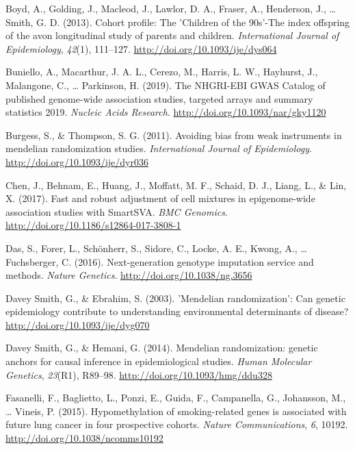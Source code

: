 \documentclass[11pt,twoside]{bristolthesis}
\newlength{\cslhangindent}
\newenvironment{cslreferences}%
  {\setlength{\parindent}{0pt}%
  \everypar{\setlength{\hangindent}{\cslhangindent}}\ignorespaces}%
  {\par}
\begin{document}
\begin{cslreferences}
\leavevmode\hypertarget{ref-Boyd2013}{}%
Boyd, A., Golding, J., Macleod, J., Lawlor, D. A., Fraser, A., Henderson, J., \ldots{} Smith, G. D. (2013). Cohort profile: The 'Children of the 90s'-The index offspring of the avon longitudinal study of parents and children. \emph{International Journal of Epidemiology}, \emph{42}(1), 111--127. \url{http://doi.org/10.1093/ije/dys064}

\leavevmode\hypertarget{ref-Buniello2019}{}%
Buniello, A., Macarthur, J. A. L., Cerezo, M., Harris, L. W., Hayhurst, J., Malangone, C., \ldots{} Parkinson, H. (2019). The NHGRI-EBI GWAS Catalog of published genome-wide association studies, targeted arrays and summary statistics 2019. \emph{Nucleic Acids Research}. \url{http://doi.org/10.1093/nar/gky1120}

\leavevmode\hypertarget{ref-Burgess2011}{}%
Burgess, S., \& Thompson, S. G. (2011). Avoiding bias from weak instruments in mendelian randomization studies. \emph{International Journal of Epidemiology}. \url{http://doi.org/10.1093/ije/dyr036}

\leavevmode\hypertarget{ref-Chen2017}{}%
Chen, J., Behnam, E., Huang, J., Moffatt, M. F., Schaid, D. J., Liang, L., \& Lin, X. (2017). Fast and robust adjustment of cell mixtures in epigenome-wide association studies with SmartSVA. \emph{BMC Genomics}. \url{http://doi.org/10.1186/s12864-017-3808-1}

\leavevmode\hypertarget{ref-Das2016}{}%
Das, S., Forer, L., Schönherr, S., Sidore, C., Locke, A. E., Kwong, A., \ldots{} Fuchsberger, C. (2016). Next-generation genotype imputation service and methods. \emph{Nature Genetics}. \url{http://doi.org/10.1038/ng.3656}

\leavevmode\hypertarget{ref-DaveySmith2003}{}%
Davey Smith, G., \& Ebrahim, S. (2003). 'Mendelian randomization': Can genetic epidemiology contribute to understanding environmental determinants of disease? \url{http://doi.org/10.1093/ije/dyg070}

\leavevmode\hypertarget{ref-DaveySmith2014}{}%
Davey Smith, G., \& Hemani, G. (2014). Mendelian randomization: genetic anchors for causal inference in epidemiological studies. \emph{Human Molecular Genetics}, \emph{23}(R1), R89--98. \url{http://doi.org/10.1093/hmg/ddu328}

\leavevmode\hypertarget{ref-Fasanelli2015}{}%
Fasanelli, F., Baglietto, L., Ponzi, E., Guida, F., Campanella, G., Johansson, M., \ldots{} Vineis, P. (2015). Hypomethylation of smoking-related genes is associated with future lung cancer in four prospective cohorts. \emph{Nature Communications}, \emph{6}, 10192. \url{http://doi.org/10.1038/ncomms10192}


\end{cslreferences}
\end{document}
